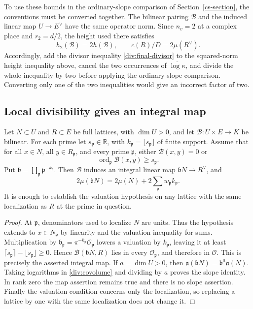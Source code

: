 To use these bounds in the ordinary-slope comparison of
Section~\ref{cs-section}, the conventions must be converted together.
The bilinear pairing $\mathcal B$ and the induced linear map
$U\to E^\vee$ have the same operator norm. Since $n_v=2$ at a complex
place and $r_2=d/2$, the height used there satisfies
\[
 h_2(\mathcal B)=2h(\mathcal B),\qquad
 c(R)/D=2\mu(R^\vee).
\]
Accordingly, add the divisor inequality
\eqref{div:final-divisor} to the squared-norm height inequality above,
cancel the two occurrences of $\overline{\log\kappa}$, and divide
the whole inequality by two before applying the ordinary-slope
comparison. Converting only one of the two inequalities would give
an incorrect factor of two.

\subsection{Local divisibility gives an integral map}

\begin{proposition}\label{div:integral-pairing}
Let $N\subset U$ and $R\subset E$ be full lattices, with $\dim U>0$, and let
$\mathcal B:U\times E\to K$ be bilinear. For each prime let
$s_{\mathfrak p}\in\mathbb R$, with
$k_{\mathfrak p}=\lfloor s_{\mathfrak p}\rfloor$ of finite support.
Assume that for all $x\in N$, all $y\in R_{\mathfrak p}$, and every
prime $\mathfrak p$, either $\mathcal B(x,y)=0$ or
\[
 \operatorname{ord}_{\mathfrak p}\mathcal B(x,y)\ge s_{\mathfrak p}.
\]
Put $\mathfrak b=\prod_{\mathfrak p}\mathfrak p^{-k_{\mathfrak p}}$.
Then $\mathcal B$ induces an integral linear map
$\mathfrak bN\to R^\vee$, and
\[
 2\mu(\mathfrak bN)=2\mu(N)
             +2\sum_{\mathfrak p}w_{\mathfrak p}k_{\mathfrak p}.
\]
It is enough to establish the valuation hypothesis on any lattice with
the same localization as $R$ at the prime in question.
\end{proposition}
\begin{proof}
At $\mathfrak p$, denominators used to localize $N$ are units. Thus the
hypothesis extends to $x\in N_{\mathfrak p}$ by linearity and the
valuation inequality for sums. Multiplication by
$\mathfrak b_{\mathfrak p}=\pi^{-k_{\mathfrak p}}\mathcal O_{\mathfrak p}$
lowers a valuation by $k_{\mathfrak p}$, leaving it at least
$\lceil s_{\mathfrak p}\rceil-\lfloor s_{\mathfrak p}\rfloor\ge0$.
Hence $\mathcal B(\mathfrak bN,R)$ lies in every
$\mathcal O_{\mathfrak p}$, and therefore in $\mathcal O$.
This is precisely the asserted integral map.
If $a=\dim U>0$, then
$\mathfrak a(\mathfrak bN)=\mathfrak b^a\mathfrak a(N)$.
Taking logarithms in \eqref{div:covolume} and dividing by $a$ proves
the slope identity. In rank zero the map assertion remains true and
there is no slope assertion. Finally the valuation condition concerns
only the localization, so replacing a lattice by one with the same
localization does not change it.
\end{proof}

